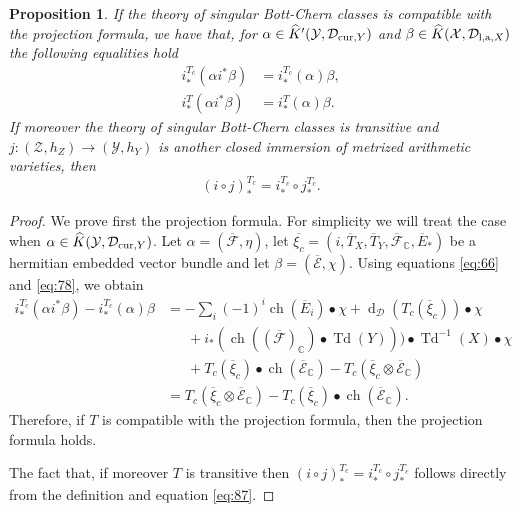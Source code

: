 \documentclass[10pt,twoside]{article}
\numberwithin{equation}{section}
\theoremstyle{plain}
\newtheorem{proposition}[equation]{Proposition}
\theoremstyle{definition}
\DeclareMathOperator{\Td}{Td}
\DeclareMathOperator{\dd}{d}
\DeclareMathOperator{\ch}{ch}
\newcommand{\las}{{\text{\rm l,a}}}
\newcommand{\D}{\text{{\rm cur}}}
\begin{document}
\begin{proposition}
  If the theory of singular Bott-Chern classes is compatible with the
  projection formula, we have that, for $\alpha \in
  \widehat K'(\mathcal{Y},\mathcal{D}_{\D,Y})$ and $\beta \in
  \widehat K(\mathcal{X},\mathcal{D}_{\las,X})$ the following
  equalities hold 
  \begin{align*}
    i^{T_{c}}_{\ast}(\alpha i^{\ast}\beta )&=i^{T_{c}}_{\ast}(\alpha )\beta,\\ 
    i^{T}_{\ast}(\alpha i^{\ast}\beta )&=i^{T}_{\ast}(\alpha )\beta. 
  \end{align*}
  If moreover the theory of singular Bott-Chern classes is transitive
  and $j\colon (\mathcal{Z},h_{Z})\longrightarrow (\mathcal{Y},h_{Y})$ is
  another closed 
  immersion of metrized arithmetic varieties, then 
  \begin{displaymath}
    (i\circ j)_{\ast}^{T_{c}}=i_{\ast}^{T_{c}}\circ j_{\ast}^{T_{c}}.
  \end{displaymath}
\end{proposition}
\begin{proof}
  We prove first the projection formula. For simplicity we will treat
  the case when $\alpha \in \widehat
  K(\mathcal{Y},\mathcal{D}_{\D,Y})$. Let $\alpha
  =(\overline{\mathcal{F}},\eta)$, let $\overline
  {\xi_{c}}=(i,\overline T_{X},\overline T_{Y},\overline {\mathcal
    F}_{\mathbb{C}},\overline E_{\ast})$   be a hermitian embedded vector bundle
  and let
  $\beta =(\overline {\mathcal{E}},\chi)$.   Using equations
  \eqref{eq:66} 
  and \eqref{eq:78}, we obtain
  \begin{align*}
    i^{T_{c}}_{\ast}(\alpha i^{\ast}\beta )-i^{T_{c}}_{\ast}(\alpha )\beta&=
    -\sum_{i}(-1)^{i}\ch(\overline E_{i})\bullet \chi +
    \dd_{\mathcal{D}}(T_{c}(\overline {\xi}_{c}))\bullet \chi\\
    &\phantom{AA}
    +i_{\ast}(\ch((\overline
    {\mathcal{F}})_{\mathbb{C}})
    \bullet \Td(Y)))\bullet\Td^{-1}(X)\bullet \chi \\
    &\phantom{AA}+T_{c}(\overline \xi_{c})\bullet \ch(\overline
    {\mathcal{E}}_{\mathbb{C}})-  
    T_{c}(\overline \xi_{c}\otimes \overline {\mathcal{E}}_{\mathbb{C}})\\
    &=
    T_{c}(\overline \xi_{c}\otimes \overline {\mathcal{E}}_{\mathbb{C}})
    -T_{c}(\overline \xi_{c})\bullet \ch(\overline
    {\mathcal{E}}_{\mathbb{C}}).
  \end{align*}
  Therefore, if $T$ is compatible with the projection formula, then
  the projection formula holds.

  The fact that, if moreover $T$ is transitive then $ (i\circ
  j)_{\ast}^{T_{c}}= i_{\ast}^{T_{c}}\circ j_{\ast}^{T_{c}}$ follows
  directly from 
  the definition and equation \eqref{eq:87}.
\end{proof}
\end{document}
